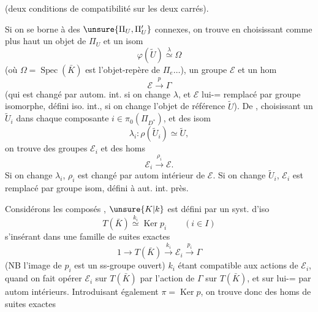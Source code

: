  (deux conditions de compatibilité sur les deux carrés).

Si on  se borne à des $\unsure{\Pi_U,\Pi'_U}$ connexes, on trouve en choisissant comme plus haut un objet  de $\Pi_U$ et un isom
\[
\boxed{\varphi(\widetilde U)\overset{\lambda}{\simeq}\Omega}
\]
(où $\Omega=\operatorname{Spec}(\bar K)$ est l'objet-repère de $\Pi_e\ldots$), un groupe $\mathcal E$ et un hom
\[
\mathcal E\xrightarrow{p}\Gamma
\]
(qui est changé par autom. int. si on change $\lambda$, et $\mathcal E$ lui-= remplacé par groupe isomorphe,  défini  iso. int., si on change l'objet de référence $\widetilde U$). De \unsure{=}, choisissant un $\widetilde U_i$ dans chaque composante $i\in\pi_0(\Pi_{D^*})$, et des isom
\[
\lambda_i:\rho(\widetilde U_i)\simeq\widetilde U,
\]
on trouve des groupes $\mathcal E_i$ et des homs
\[
\mathcal E_i\xrightarrow{\rho_i}\mathcal E.
\]
Si on change $\lambda_i$, $\rho_i$ est changé par autom intérieur de $\mathcal E$. Si on change  $\widetilde U_i$, $\mathcal E_i$ est remplacé par groupe isom, défini à aut. int. près.

Considérons les composés
,  $\unsure{K|k}$ est défini par un syst. d'iso
\[
T(\bar K)\overset{k_i}{\simeq}\operatorname{Ker}p_i\qquad(i\in I)
\]
s'insérant dans une famille de suites exactes
\[
1\longrightarrow T(\bar K)\xrightarrow{k_i}\mathcal E_i\xrightarrow{p_i}\Gamma
\]
(NB l'image de $p_i$ est un ss-groupe ouvert)
$k_i$ étant compatible aux actions de $\mathcal E_i$, quand on fait opérer $\mathcal E_i$ sur $T(\bar K)$ par l'action de $\Gamma$ sur $T(\bar K)$, et sur lui-= par autom intérieurs. Introduisant également $\pi=\operatorname{Ker}p$, on trouve donc des homs de suites exactes

